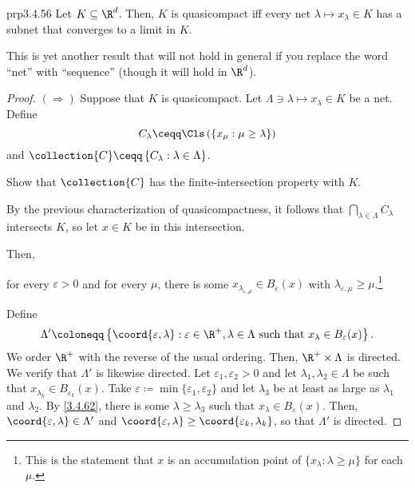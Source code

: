 \begin{thm}{}{prp3.4.56}
Let $K\subseteq \R ^d$.  Then, $K$ is quasicompact iff every net $\lambda \mapsto x_\lambda \in K$ has a subnet that converges to a limit in $K$.
\begin{rmk}
This is yet another result that will not hold in general if you replace the word ``net'' with ``sequence'' (though it will hold in $\R ^d$).
\end{rmk}
\begin{proof}
$(\Rightarrow )$ Suppose that $K$ is quasicompact.  Let $\Lambda \ni \lambda \mapsto x_\lambda \in K$ be a net.  Define
\begin{equation}
C_\lambda \ceqq \Cls \left( \left\{ x_\mu :\mu \geq \lambda \right\} \right) 
\end{equation}
and $\collection{C}\ceqq \left\{ C_\lambda :\lambda \in \Lambda \right\}$.
\begin{exr}[breakable=false]{}{}
Show that $\collection{C}$ has the finite-intersection property with $K$.
\end{exr}
By the previous characterization of quasicompactness, it follows that $\bigcap _{\lambda \in \Lambda}C_\lambda$ intersects $K$, so let $x\in K$ be in this intersection.

Then,
\begin{textequation}[3.4.62]
for every $\varepsilon >0$ and for every $\mu$, there is some $x_{\lambda _{\varepsilon ,\mu}}\in B_\varepsilon (x)$ with $\lambda _{\varepsilon ,\mu}\geq \mu$.\footnote{This is the statement that $x$ is an accumulation point of $\{ x_{\lambda}:\lambda \geq \mu \}$ for each $\mu$.}
\end{textequation}
Define
\begin{equation*}
\Lambda '\coloneqq \left\{ \coord{\varepsilon ,\lambda}:\varepsilon \in \R ^+,\lambda \in \Lambda \text{ such that }x_\lambda \in B_{\varepsilon}(x)\right\} .
\end{equation*}
We order $\R ^+$ with the reverse of the usual ordering.  Then, $\R ^+\times \Lambda$ is directed.  We verify that $\Lambda '$ is likewise directed.  Let $\varepsilon _1,\varepsilon _2>0$ and let $\lambda _1,\lambda _2\in \Lambda$ be such that $x_{\lambda _k}\in B_{\varepsilon _k}(x)$.  Take $\varepsilon \coloneqq \min \{ \varepsilon _1,\varepsilon _2\}$ and let $\lambda _3$ be at least as large as $\lambda _1$ and $\lambda _2$.  By \eqref{3.4.62}, there is some $\lambda \geq \lambda _3$ such that $x_\lambda \in B_\varepsilon (x)$.  Then, $\coord{\varepsilon ,\lambda}\in \Lambda '$ and $\coord{\varepsilon ,\lambda}\geq \coord{\varepsilon _k,\lambda _k}$, so that $\Lambda '$ is directed.


\end{proof}
\end{thm}
